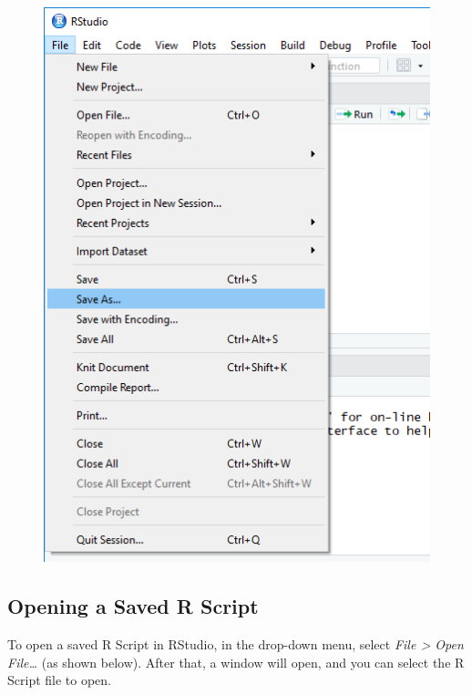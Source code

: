 \documentclass[]{book}
\begin{document}
\begin{figure}
\centering
\includegraphics{Saving R Script.png}
\caption{}
\end{figure}

\subsection{Opening a Saved R Script}\label{opening-a-saved-r-script}

To open a saved R Script in RStudio, in the drop-down menu, select
\emph{File \textgreater{} Open File\ldots{}} (as shown below). After
that, a window will open, and you can select the R Script file to open.
\end{document}
